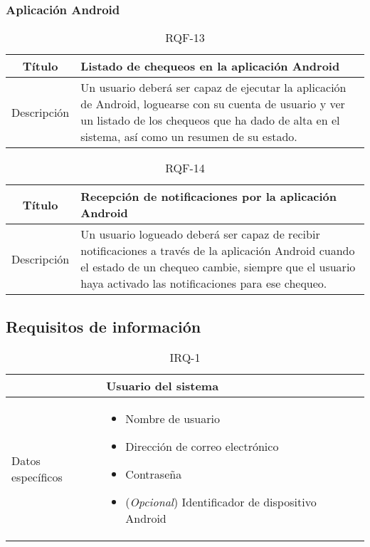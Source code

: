 \FloatBarrier
\subsubsection{Aplicación Android}


\begin{table}[h!]
  \centering
  \begin{tabularx}{\textwidth}{|c|X|}
    \hline
    Título & Listado de chequeos en la aplicación Android \\

    \hline

    Descripción & Un usuario deberá ser capaz de ejecutar la aplicación de
    Android, loguearse con su cuenta de usuario y ver un listado de los chequeos
    que ha dado de alta en el sistema, así como un resumen de su estado.
    \\

    \hline
  \end{tabularx}
  \caption{RQF-13}
\end{table}


\begin{table}[h!]
  \centering
  \begin{tabularx}{\textwidth}{|c|X|}
    \hline
    Título & Recepción de notificaciones por la aplicación Android \\

    \hline

    Descripción & Un usuario logueado deberá ser capaz de recibir notificaciones
    a través de la aplicación Android cuando el estado de un chequeo cambie,
    siempre que el usuario haya activado las notificaciones para ese
    chequeo. \\

    \hline
  \end{tabularx}
  \caption{RQF-14}
\end{table}

\FloatBarrier
\subsection{Requisitos de información}
\label{sec:requisitos-informacion}


\begin{table}[h!]
  \centering
  \begin{tabularx}{\textwidth}{|l|X|}
    \hline

    & Usuario del sistema\\

    \hline
    Datos específicos &

    \begin{itemize}
    \item Nombre de usuario
    \item Dirección de correo electrónico
    \item Contraseña
    \item (\textit{Opcional}) Identificador de dispositivo Android
    \end{itemize}
    \\
    
    \hline
    
  \end{tabularx}
  \caption{IRQ-1}
\end{table}


